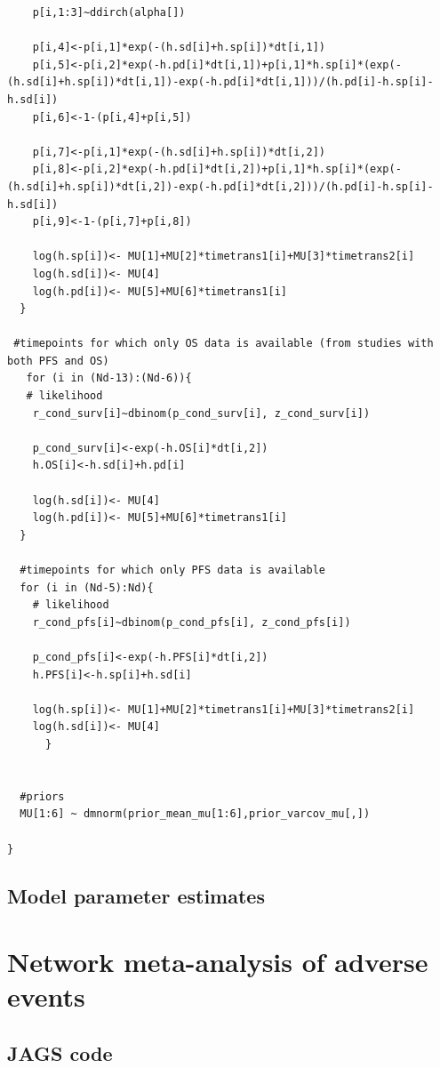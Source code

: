 \documentclass[11pt,final,fleqn]{article}\usepackage[]{graphicx}\usepackage[]{color}
\theoremstyle{plain}
\begin{document}
\begin{appendices}
\begin{verbatim}
    p[i,1:3]~ddirch(alpha[])
    
    p[i,4]<-p[i,1]*exp(-(h.sd[i]+h.sp[i])*dt[i,1])
    p[i,5]<-p[i,2]*exp(-h.pd[i]*dt[i,1])+p[i,1]*h.sp[i]*(exp(-(h.sd[i]+h.sp[i])*dt[i,1])-exp(-h.pd[i]*dt[i,1]))/(h.pd[i]-h.sp[i]-h.sd[i])
    p[i,6]<-1-(p[i,4]+p[i,5])
    
    p[i,7]<-p[i,1]*exp(-(h.sd[i]+h.sp[i])*dt[i,2])
    p[i,8]<-p[i,2]*exp(-h.pd[i]*dt[i,2])+p[i,1]*h.sp[i]*(exp(-(h.sd[i]+h.sp[i])*dt[i,2])-exp(-h.pd[i]*dt[i,2]))/(h.pd[i]-h.sp[i]-h.sd[i])
    p[i,9]<-1-(p[i,7]+p[i,8])
    
    log(h.sp[i])<- MU[1]+MU[2]*timetrans1[i]+MU[3]*timetrans2[i] 
    log(h.sd[i])<- MU[4] 
    log(h.pd[i])<- MU[5]+MU[6]*timetrans1[i]
  }
  
 #timepoints for which only OS data is available (from studies with both PFS and OS)
   for (i in (Nd-13):(Nd-6)){
   # likelihood
    r_cond_surv[i]~dbinom(p_cond_surv[i], z_cond_surv[i]) 
    
    p_cond_surv[i]<-exp(-h.OS[i]*dt[i,2])
    h.OS[i]<-h.sd[i]+h.pd[i]
    
    log(h.sd[i])<- MU[4]
    log(h.pd[i])<- MU[5]+MU[6]*timetrans1[i]
  }
    
  #timepoints for which only PFS data is available 
  for (i in (Nd-5):Nd){
    # likelihood
    r_cond_pfs[i]~dbinom(p_cond_pfs[i], z_cond_pfs[i]) 
    
    p_cond_pfs[i]<-exp(-h.PFS[i]*dt[i,2])
    h.PFS[i]<-h.sp[i]+h.sd[i]
    
    log(h.sp[i])<- MU[1]+MU[2]*timetrans1[i]+MU[3]*timetrans2[i] 
    log(h.sd[i])<- MU[4] 
      }
  
  
  #priors
  MU[1:6] ~ dmnorm(prior_mean_mu[1:6],prior_varcov_mu[,]) 

}

\end{verbatim}

\subsection{Model parameter estimates}



\section{Network meta-analysis of adverse events}
\subsection{JAGS code}




\end{appendices}
\end{document}
